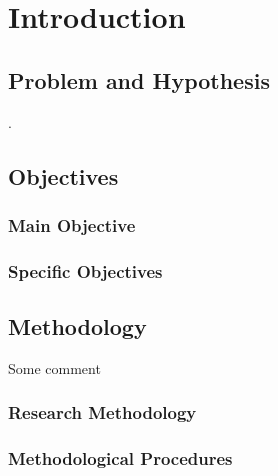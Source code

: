 \chapter{Introduction}

\lipsum[1]

\section{Problem and Hypothesis}

\lipsum[1]. 

\section{Objectives}

\lipsum[7]

\subsection{Main Objective}

\lipsum[2]

\subsection{Specific Objectives}

\lipsum[8]

\section{Methodology}

Some comment

\subsection{Research Methodology}

\lipsum[3]

\subsection{Methodological Procedures}

\lipsum[5]















